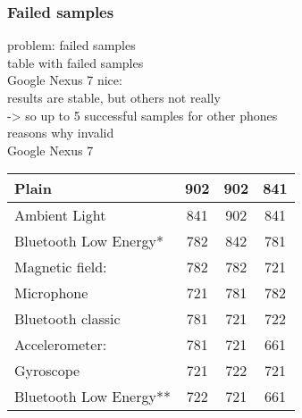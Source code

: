 \subsubsection{Failed samples}
problem: failed samples\\
	table with failed samples\\
	Google Nexus 7 nice:\\
		results are stable, but others not really\\
			-> so up to 5 successful samples for other phones\\
	reasons why invalid\\
	
	
	Google Nexus 7\\
\begin{table}
    \begin{tabular}{| l | c | c | c |}
    \hline
    Plain                  & 902 & 902 & 841 \\ \hline
    Ambient Light          & 841 & 902 & 841\\ \hline
    Bluetooth Low Energy*  & 782 & 842 & 781 \\ \hline
    Magnetic field:        & 782 & 782 & 721\\ \hline
    Microphone             & 721 & 781 & 782 \\ \hline
    Bluetooth classic      & 781 & 721 & 722 \\ \hline
    Accelerometer:         & 781 & 721 & 661 \\ \hline
    Gyroscope              & 721 & 722 & 721 \\ \hline
    Bluetooth Low Energy** & 722 & 721 & 661 \\ \hline
    \end{tabular}
\end{table}


